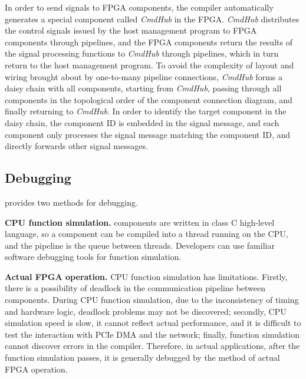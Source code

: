 In order to send signals to FPGA components, the \name compiler automatically generates a special component called \textit {CmdHub} in the FPGA.
\textit {CmdHub} distributes the control signals issued by the host management program to FPGA components through pipelines, and the FPGA components return the results of the signal processing functions to \textit {CmdHub} through pipelines, which in turn return to the host management program.
To avoid the complexity of layout and wiring brought about by one-to-many pipeline connections, \textit {CmdHub} forms a daisy chain with all components, starting from \textit {CmdHub}, passing through all components in the topological order of the component connection diagram, and finally returning to \textit {CmdHub}.
In order to identify the target component in the daisy chain, the component ID is embedded in the signal message, and each component only processes the signal message matching the component ID, and directly forwards other signal messages.
 

\subsection{Debugging}
\label{clicknp:subsec:debug}

\name provides two methods for debugging.

\textbf{CPU function simulation.}
\name components are written in class C high-level language, so a component can be compiled into a thread running on the CPU, and the pipeline is the queue between threads. Developers can use familiar software debugging tools for function simulation.



\textbf{Actual FPGA operation.}
CPU function simulation has limitations. Firstly, there is a possibility of deadlock in the communication pipeline between components. During CPU function simulation, due to the inconsistency of timing and hardware logic, deadlock problems may not be discovered; secondly, CPU simulation speed is slow, it cannot reflect actual performance, and it is difficult to test the interaction with PCIe DMA and the network; finally, function simulation cannot discover errors in the compiler. Therefore, in actual applications, after the function simulation passes, it is generally debugged by the method of actual FPGA operation.

